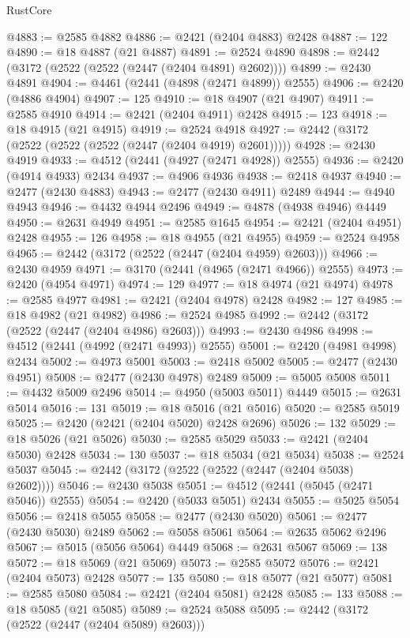 \begin{lexlean}{RustCore}
\begin{coremodule}
@4883 := @2585 @4882
@4886 := @2421 (@2404 @4883) @2428
@4887 := 122
@4890 := @18 @4887 (@21 @4887)
@4891 := @2524 @4890
@4898 := @2442 (@3172 (@2522 (@2522 (@2447 (@2404 @4891) @2602))))
@4899 := @2430 @4891
@4904 := @4461 (@2441 (@4898 (@2471 @4899)) @2555)
@4906 := @2420 (@4886 @4904)
@4907 := 125
@4910 := @18 @4907 (@21 @4907)
@4911 := @2585 @4910
@4914 := @2421 (@2404 @4911) @2428
@4915 := 123
@4918 := @18 @4915 (@21 @4915)
@4919 := @2524 @4918
@4927 := @2442 (@3172 (@2522 (@2522 (@2522 (@2447 (@2404 @4919) @2601)))))
@4928 := @2430 @4919
@4933 := @4512 (@2441 (@4927 (@2471 @4928)) @2555)
@4936 := @2420 (@4914 @4933) @2434
@4937 := @4906 @4936
@4938 := @2418 @4937
@4940 := @2477 (@2430 @4883)
@4943 := @2477 (@2430 @4911) @2489
@4944 := @4940 @4943
@4946 := @4432 @4944 @2496
@4949 := @4878 (@4938 @4946) @4449
@4950 := @2631 @4949
@4951 := @2585 @1645
@4954 := @2421 (@2404 @4951) @2428
@4955 := 126
@4958 := @18 @4955 (@21 @4955)
@4959 := @2524 @4958
@4965 := @2442 (@3172 (@2522 (@2447 (@2404 @4959) @2603)))
@4966 := @2430 @4959
@4971 := @3170 (@2441 (@4965 (@2471 @4966)) @2555)
@4973 := @2420 (@4954 @4971)
@4974 := 129
@4977 := @18 @4974 (@21 @4974)
@4978 := @2585 @4977
@4981 := @2421 (@2404 @4978) @2428
@4982 := 127
@4985 := @18 @4982 (@21 @4982)
@4986 := @2524 @4985
@4992 := @2442 (@3172 (@2522 (@2447 (@2404 @4986) @2603)))
@4993 := @2430 @4986
@4998 := @4512 (@2441 (@4992 (@2471 @4993)) @2555)
@5001 := @2420 (@4981 @4998) @2434
@5002 := @4973 @5001
@5003 := @2418 @5002
@5005 := @2477 (@2430 @4951)
@5008 := @2477 (@2430 @4978) @2489
@5009 := @5005 @5008
@5011 := @4432 @5009 @2496
@5014 := @4950 (@5003 @5011) @4449
@5015 := @2631 @5014
@5016 := 131
@5019 := @18 @5016 (@21 @5016)
@5020 := @2585 @5019
@5025 := @2420 (@2421 (@2404 @5020) @2428 @2696)
@5026 := 132
@5029 := @18 @5026 (@21 @5026)
@5030 := @2585 @5029
@5033 := @2421 (@2404 @5030) @2428
@5034 := 130
@5037 := @18 @5034 (@21 @5034)
@5038 := @2524 @5037
@5045 := @2442 (@3172 (@2522 (@2522 (@2447 (@2404 @5038) @2602))))
@5046 := @2430 @5038
@5051 := @4512 (@2441 (@5045 (@2471 @5046)) @2555)
@5054 := @2420 (@5033 @5051) @2434
@5055 := @5025 @5054
@5056 := @2418 @5055
@5058 := @2477 (@2430 @5020)
@5061 := @2477 (@2430 @5030) @2489
@5062 := @5058 @5061
@5064 := @2635 @5062 @2496
@5067 := @5015 (@5056 @5064) @4449
@5068 := @2631 @5067
@5069 := 138
@5072 := @18 @5069 (@21 @5069)
@5073 := @2585 @5072
@5076 := @2421 (@2404 @5073) @2428
@5077 := 135
@5080 := @18 @5077 (@21 @5077)
@5081 := @2585 @5080
@5084 := @2421 (@2404 @5081) @2428
@5085 := 133
@5088 := @18 @5085 (@21 @5085)
@5089 := @2524 @5088
@5095 := @2442 (@3172 (@2522 (@2447 (@2404 @5089) @2603)))

\end{coremodule}
\end{lexlean}
